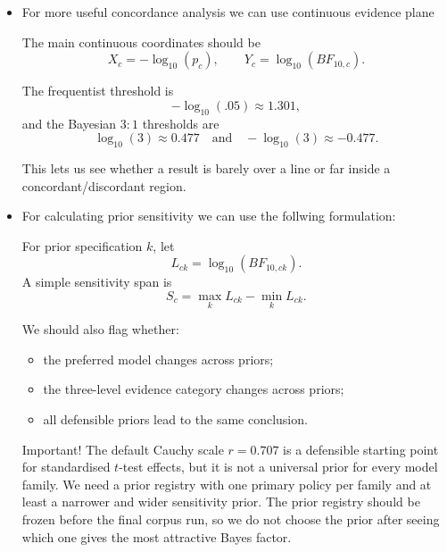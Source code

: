 \documentclass[11pt,a4paper]{article}
\begin{document}
\begin{itemize}
I think it is useful to distinguish:
\begin{itemize}
    \item \emph{effect concordance}: significant and evidence for \(M_1\);
    \item \emph{null concordance}: non-significant and evidence for \(M_0\);
    \item \emph{resolution difference}: one framework gives a conventional decision while the Bayesian result is inconclusive;
    \item \emph{direct discordance}: the two frameworks favour opposite sides.
\end{itemize}

    \item For more useful concordance analysis we can use continuous evidence plane

The main continuous coordinates should be
\[
X_c=-\log_{10}(p_c),
\qquad
Y_c=\log_{10}(BF_{10,c}).
\]

The frequentist threshold is
\[
-\log_{10}(.05)\approx1.301,
\]
and the Bayesian \(3{:}1\) thresholds are
\[
\log_{10}(3)\approx0.477
\quad\text{and}\quad
-\log_{10}(3)\approx-0.477.
\]

This lets us see whether a result is barely over a line or far inside a concordant/discordant region.

    \item For calculating prior sensitivity we can use the follwing formulation:

For prior specification \(k\), let
\[
L_{ck}=\log_{10}(BF_{10,ck}).
\]
A simple sensitivity span is
\[
S_c=
\max_k L_{ck}-\min_k L_{ck}.
\]

We should also flag whether:
\begin{itemize}
    \item the preferred model changes across priors;
    \item the three-level evidence category changes across priors;
    \item all defensible priors lead to the same conclusion.
\end{itemize}

Important! The default Cauchy scale \(r=0.707\) is a defensible starting point for standardised \(t\)-test effects, but it is not a universal prior for every model family. We need a prior registry with one primary policy per family and at least a narrower and wider sensitivity prior. The prior registry should be frozen before the final corpus run, so we do not choose the prior after seeing which one gives the most attractive Bayes factor.



\end{itemize}
\end{document}
